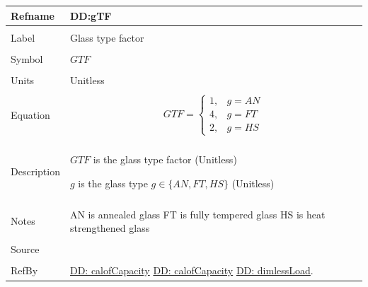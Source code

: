 \documentclass[12pt]{article}
\begin{document}
\noindent \begin{minipage}{\textwidth}
\begin{tabular}{p{} p{}}
\toprule \textbf{Refname} & \textbf{DD:gTF}
\label{DD:gTF}
\\ \midrule \\
Label & Glass type factor
\\ \midrule \\
Symbol & $GTF$
\\ \midrule \\
Units & Unitless
\\ \midrule \\
Equation & \begin{displaymath}
           GTF=\begin{cases}
1, & g=AN\\
4, & g=FT\\
2, & g=HS
\end{cases}
           \end{displaymath}
\\ \midrule \\
Description & \begin{symbDescription}
              \item{$GTF$ is the glass type factor (Unitless)}
              \item{$g$ is the glass type $g\in{}\{AN,FT,HS\}$ (Unitless)}
              \end{symbDescription}
\\ \midrule \\
Notes & AN is annealed glass
        FT is fully tempered glass
        HS is heat strengthened glass
\\ \midrule \\
Source & \cite{astm2009}
\\ \midrule \\
RefBy & \hyperref[DD:calofCapacity]{DD: calofCapacity} \hyperref[DD:calofCapacity]{DD: calofCapacity} \hyperref[DD:dimlessLoad]{DD: dimlessLoad}.
\\ \bottomrule \end{tabular}
\end{minipage}
\par~
\end{document}
